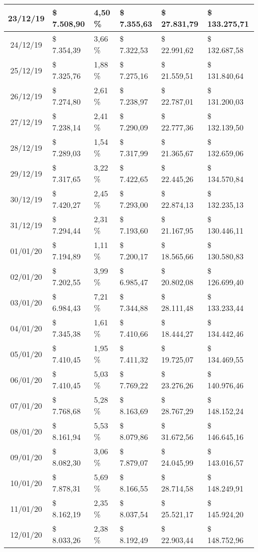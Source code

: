 \begin{small}
\begin{longtable}{|c|l|l|l|l|l|}
23/12/19 & \$ 7.508,90 & 4,50 \% & \$ 7.355,63 & \$ 27.831,79 & \$ 133.275,71 \\ \hline
24/12/19 & \$ 7.354,39 & 3,66 \% & \$ 7.322,53 & \$ 22.991,62 & \$ 132.687,58 \\ \hline
25/12/19 & \$ 7.325,76 & 1,88 \% & \$ 7.275,16 & \$ 21.559,51 & \$ 131.840,64 \\ \hline
26/12/19 & \$ 7.274,80 & 2,61 \% & \$ 7.238,97 & \$ 22.787,01 & \$ 131.200,03 \\ \hline
27/12/19 & \$ 7.238,14 & 2,41 \% & \$ 7.290,09 & \$ 22.777,36 & \$ 132.139,50 \\ \hline
28/12/19 & \$ 7.289,03 & 1,54 \% & \$ 7.317,99 & \$ 21.365,67 & \$ 132.659,06 \\ \hline
29/12/19 & \$ 7.317,65 & 3,22 \% & \$ 7.422,65 & \$ 22.445,26 & \$ 134.570,84 \\ \hline
30/12/19 & \$ 7.420,27 & 2,45 \% & \$ 7.293,00 & \$ 22.874,13 & \$ 132.235,13 \\ \hline
31/12/19 & \$ 7.294,44 & 2,31 \% & \$ 7.193,60 & \$ 21.167,95 & \$ 130.446,11 \\ \hline
01/01/20 & \$ 7.194,89 & 1,11 \% & \$ 7.200,17 & \$ 18.565,66 & \$ 130.580,83 \\ \hline
02/01/20 & \$ 7.202,55 & 3,99 \% & \$ 6.985,47 & \$ 20.802,08 & \$ 126.699,40 \\ \hline
03/01/20 & \$ 6.984,43 & 7,21 \% & \$ 7.344,88 & \$ 28.111,48 & \$ 133.233,44 \\ \hline
04/01/20 & \$ 7.345,38 & 1,61 \% & \$ 7.410,66 & \$ 18.444,27 & \$ 134.442,46 \\ \hline
05/01/20 & \$ 7.410,45 & 1,95 \% & \$ 7.411,32 & \$ 19.725,07 & \$ 134.469,55 \\ \hline
06/01/20 & \$ 7.410,45 & 5,03 \% & \$ 7.769,22 & \$ 23.276,26 & \$ 140.976,46 \\ \hline
07/01/20 & \$ 7.768,68 & 5,28 \% & \$ 8.163,69 & \$ 28.767,29 & \$ 148.152,24 \\ \hline
08/01/20 & \$ 8.161,94 & 5,53 \% & \$ 8.079,86 & \$ 31.672,56 & \$ 146.645,16 \\ \hline
09/01/20 & \$ 8.082,30 & 3,06 \% & \$ 7.879,07 & \$ 24.045,99 & \$ 143.016,57 \\ \hline
10/01/20 & \$ 7.878,31 & 5,69 \% & \$ 8.166,55 & \$ 28.714,58 & \$ 148.249,91 \\ \hline
11/01/20 & \$ 8.162,19 & 2,35 \% & \$ 8.037,54 & \$ 25.521,17 & \$ 145.924,20 \\ \hline
12/01/20 & \$ 8.033,26 & 2,38 \% & \$ 8.192,49 & \$ 22.903,44 & \$ 148.752,96 \\ \hline

\end{longtable}
\end{small}
